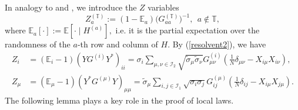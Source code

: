 In analogy to \cite[Section 3]{EKYY1} and \cite[Section 5]{Anisotropic}, we introduce the $Z$ variables
\begin{equation*}
  Z_{a}^{(\mathbb T)}:=(1-\mathbb E_{a})\big(G_{aa}^{(\mathbb T)}\big)^{-1}, \ \ a\notin \mathbb T,
\end{equation*}
where $\mathbb E_{a}[\cdot]:=\mathbb E[\cdot\mid H^{(a)}],$ i.e. it is the partial expectation over the randomness of the $a$-th row and column of $H$. By (\ref{resolvent2}), we have
\begin{align}
Z_i &= (\mathbb E_{i} - 1) \left( {YG^{\left( i \right)} Y^*} \right)_{ii} = \sigma_i \sum_{\mu ,\nu\in \mathcal I_2} \sqrt{\tilde \sigma_\mu \tilde \sigma_\nu}G^{(i)}_{\mu\nu} \left(\frac{1}{N}\delta_{\mu\nu} - X_{i\mu}X_{i\nu}\right),\label{Zi}\\
Z_\mu &= (\mathbb E_{\mu} - 1) \left( {Y^*  G^{\left( \mu  \right)} Y} \right)_{\mu \mu } = \tilde \sigma_\mu \sum_{i,j \in \mathcal I_1} \sqrt{\sigma_i \sigma_j}G^{(\mu)}_{ij} \left(\frac{1}{N} \delta_{ij} - X_{i\mu}X_{j\mu}\right).\label{Zmu}
\end{align}
The following lemma plays a key role in the proof of local laws.

